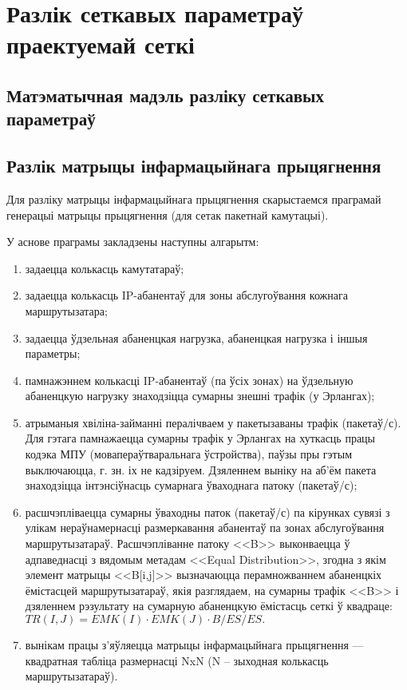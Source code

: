 \section{Разлік сеткавых параметраў праектуемай сеткі}

\subsection{Матэматычная мадэль разліку сеткавых параметраў}

\subsection{Разлік матрыцы інфармацыйнага прыцягнення}

Для разліку матрыцы інфармацыйнага прыцягнення скарыстаемся
праграмай генерацыі матрыцы прыцягнення (для сетак пакетнай камутацыі).

У аснове праграмы закладзены наступны алгарытм:
\begin{enumerate}
    \item задаецца колькасць камутатараў;
    \item задаецца колькасць IP-абанентаў для зоны абслугоўвання
          кожнага маршрутызатара;
    \item задаецца ўдзельная абаненцкая нагрузка,
          абаненцкая нагрузка і іншыя параметры;
    \item памнажэннем колькасці IP-абанентаў (па ўсіх зонах)
          на ўдзельную абаненцкую нагрузку знаходзіцца
          сумарны знешні трафік (у Эрлангах);
    \item атрыманыя хвіліна-займанні пералічваем у пакетызаваны
          трафік (пакетаў/с).
          Для гэтага памнажаецца сумарны трафік у Эрлангах на
          хуткасць працы кодэка МПУ (мовапераўтваральнага ўстройства),
          паўзы пры гэтым выключаюцца,
          г. зн. іх не кадзіруем. Дзяленнем выніку на
          аб'ём пакета знаходзіцца інтэнсіўнасць
          сумарнага ўваходнага патоку (пакетаў/с);
    \item расшчэпліваецца сумарны ўваходны паток (пакетаў/с) па
          кірунках сувязі з улікам нераўнамернасці размеркавання
          абанентаў па зонах абслугоўвання маршрутызатараў.
          Расшчэпліванне патоку <<B>> выконваецца ў адпаведнасці
          з вядомым метадам <<Equal Distribution>>, згодна з якім
          элемент матрыцы <<B[i,j]>> вызначаюцца перамножваннем
          абаненцкіх ёмістасцей маршрутызатараў, якія разглядаем,
          на сумарны трафік <<B>> і дзяленнем рэзультату на
          сумарную абаненцкую ёмістасць сеткі ў квадраце:
          $TR(I,J) = EMK(I) \cdot EMK(J) \cdot B / ES / ES.$
    \item вынікам працы з'яўляецца матрыцы інфармацыйнага прыцягнення ---
          квадратная таб\-лі\-ца размернасці NxN (N -- зыходная колькасць
          маршрутызатараў).
\end{enumerate}

